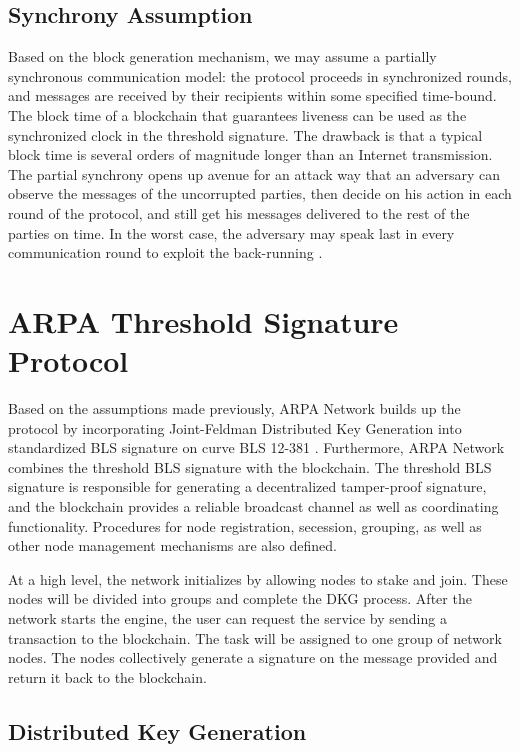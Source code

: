 \documentclass[11pt]{article}
\begin{document}
\subsection{Synchrony Assumption}

Based on the block generation mechanism, we may assume a partially synchronous communication model: the protocol proceeds in synchronized rounds, and messages are received by their recipients within some specified time-bound. The block time of a blockchain that guarantees liveness can be used as the synchronized clock in the threshold signature. The drawback is that a typical block time is several orders of magnitude longer than an Internet transmission. The partial synchrony opens up avenue for an attack way that an adversary can observe the messages of the uncorrupted parties, then decide on his action in each round of the protocol, and still get his messages delivered to the rest of the parties on time. In the worst case, the adversary may speak last in every communication round to exploit the back-running \cite{gennaro2007secure}.

\section{ARPA Threshold Signature Protocol}

Based on the assumptions made previously, ARPA Network builds up the protocol by incorporating Joint-Feldman Distributed Key Generation into standardized BLS signature \cite{irtf-cfrg-bls-signature-05} on curve BLS 12-381 \cite{sean2017bls}. Furthermore, ARPA Network combines the threshold BLS signature with the blockchain. The threshold BLS signature is responsible for generating a decentralized tamper-proof signature, and the blockchain provides a reliable broadcast channel as well as coordinating functionality. Procedures for node registration, secession, grouping, as well as other node management mechanisms are also defined.

At a high level, the network initializes by allowing nodes to stake and join. These nodes will be divided into groups and complete the DKG process. After the network starts the engine, the user can request the service by sending a transaction to the blockchain. The task will be assigned to one group of network nodes. The nodes collectively generate a signature on the message provided and return it back to the blockchain.

\subsection{Distributed Key Generation}
\end{document}
